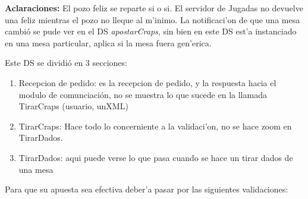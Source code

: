 
% 

\textbf{Aclaraciones: }El pozo feliz se reparte si o si. El servidor de Jugadas no devuelve una feliz mientras el pozo no lleque al m'inimo.
La notificaci'on de que una mesa cambió se pude ver en el DS \textit{apostarCraps}, sin bien en este DS est'a instanciado en una mesa particular, aplica si la mesa fuera gen'erica.


Este DS se dividió en 3 secciones:
\begin{enumerate}
 \item Recepcion de pedido: es la recepcion de pedido,  y la respuesta hacia el modulo de comunciación, no se muestra lo que sucede en la llamada TirarCraps (usuario, unXML)
\item  TirarCraps: Hace todo lo concerniente a la validaci'on, no se hace zoom en TirarDados.
\item TirarDados: aqui puede verse lo que pasa cuando se hace un tirar dados de una mesa
\end{enumerate}






Para que su apuesta sea efectiva deber'a pasar por las siguientes validaciones:

